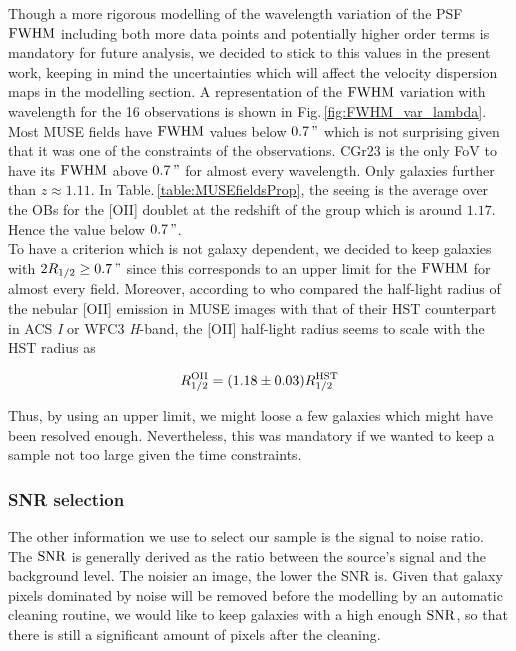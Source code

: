 Though a more rigorous modelling of the wavelength variation of the PSF $\rm{FWHM}$ including both more data points and potentially higher order terms is mandatory for future analysis, we decided to stick to this values in the present work, keeping in mind the uncertainties which will affect the velocity dispersion maps in the modelling section. A representation of the $\rm{FWHM}$ variation with wavelength for the 16 observations is shown in Fig.\,\ref{fig:FWHM_var_lambda}. Most MUSE fields have $\rm{FWHM}$ values below $\SI{0.7}{"}$ which is not surprising given that it was one of the constraints of the observations. CGr23 is the only FoV to have its $\rm{FWHM}$ above $\SI{0.7}{"}$ for almost every wavelength. Only galaxies further than $z \approx 1.11$. In Table.\,\ref{table:MUSEfieldsProp}, the seeing is the average over the OBs for the [OII] doublet at the redshift of the group which is around $1.17$. Hence the value below $\SI{0.7}{"}$. \\

To have a criterion which is not galaxy dependent, we decided to keep galaxies with $2 R_{1/2} \geq \SI{0.7}{"}$ since this corresponds to an upper limit for the $\rm{FWHM}$ for almost every field. Moreover, according to  who compared the half-light radius of the nebular [OII] emission in MUSE images with that of their HST counterpart in ACS \textit{I} or WFC3 \textit{H}-band, the [OII] half-light radius seems to scale with the HST radius as 

\begin{equation}
	R_{1/2}^{\rm{OII}} = (1.18 \pm 0.03) R_{1/2}^{\rm{HST}}
\end{equation}

Thus, by using an upper limit, we might loose a few galaxies which might have been resolved enough. Nevertheless, this was mandatory if we wanted to keep a sample not too large given the time constraints.

\subsubsection{SNR selection}
\label{sec:cut_SNR}

The other information we use to select our sample is the signal to noise ratio. The $\rm{SNR}$ is generally derived as the ratio between the source's signal and the background level. The noisier an image, the lower the SNR is. Given that galaxy pixels dominated by noise will be removed before the modelling by an automatic cleaning routine, we would like to keep galaxies with a high enough $\rm{SNR}$, so that there is still a significant amount of pixels after the cleaning. 

